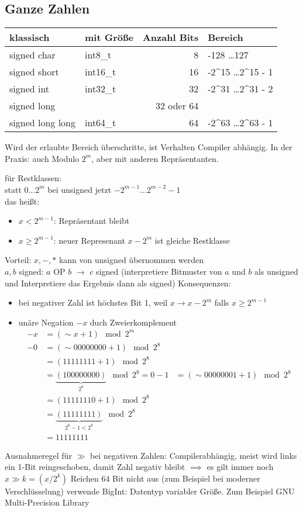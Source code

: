 \documentclass[a4paper]{scrartcl}
\theoremstyle{definition}
\theoremstyle{plain}
\theoremstyle{remark}
\theoremstyle{remark}
\begin{document}
\subsection{Ganze Zahlen}
\label{sec-16-2}
\begin{center}
\begin{tabular}{llrl}
klassisch & mit Größe & Anzahl Bits & Bereich\\
\hline
signed char & int8\_t & 8 & -128 \ldots 127\\
signed short & int16\_t & 16 & -2\^{}15 \ldots 2\^{}15 - 1\\
signed int & int32\_t & 32 & -2\^{}31 \ldots 2\^{}31 - 2\\
signed long &  & 32 oder 64 & \\
signed long long & int64\_t & 64 & -2\^{}63 \ldots 2\^{}63 - 1\\
\end{tabular}
\end{center}
Wird der erlaubte Bereich überschritte, ist Verhalten Compiler abhängig.
In der Praxis: auch Modulo $2^m$, aber mit anderen Repräsentanten.


für Restklassen: \\
   statt $0\ldots 2^m$ bei unsigned jetzt $-2^{m - 1} \ldots 2^{m - 2} - 1$ \\
   das heißt:
\begin{itemize}
\item $x < 2^{m - 1}$: Repräsentant bleibt
\item $x \geq 2^{m - 1}$: neuer Represenant $x - 2^{m}$ ist gleiche Restklasse
\end{itemize}
 Vorteil: $x, -, *$ kann von unsigned übernommen werden \\
   $a,b$ signed: $a$ OP $b$ $\to$ $c$ signed
 (interpretiere Bitmuster von $a$ und $b$ als unsigned und Interpretiere das Ergebnis dann als signed)
Konsequenzen:
\begin{itemize}
\item bei negativer Zahl ist höchstes Bit 1, weil $x \to x - 2^m$ falls $x \geq 2^{m - 1}$
\item unäre Negation $-x$ duch Zweierkomplement
\begin{align*}
-x &= (\sim x + 1) \mod 2^m \\
-0 &= (\sim 00000000 + 1) \mod 2^8 \\
&= (11111111 + 1) \mod 2^8 \\
&= \underbrace{(100000000)}_{2^8} \mod 2^8 = 0
-1 &= (\sim 00000001 + 1) \mod 2^8 \\
&= (11111110 + 1) \mod 2^8 \\
&= \underbrace{(11111111)}_{2^8 - 1 < 2^8} \mod 2^8 \\
&= 11111111
\end{align*}
\end{itemize}
Ausnahmeregel für $\gg$ bei negativen Zahlen: Compilerabhängig, meist wird links
ein 1-Bit reingeschoben, damit Zahl negativ bleibt $\implies$ es gilt immer noch $x \gg k = (x / 2^k)$
Reichen 64 Bit nicht aus (zum Beispiel bei moderner Verschlüsselung) verwende BigInt: Datentyp variabler Größe.
Zum Beispiel GNU Multi-Precision Library
\end{document}
